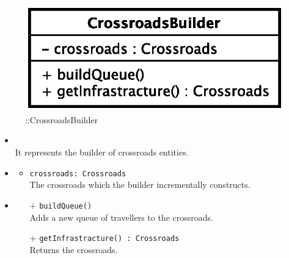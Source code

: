 \begin{figure}[h]
\centering
\includegraphics[scale=0.6,keepaspectratio]{images/solution/app/backend/crossroads_builder.eps}
\caption{\pReactiveBuild::CrossroadsBuilder}
\label{fig:sd-app-crossroads_builder}
\end{figure}
\FloatBarrier
\begin{itemize}
  \item \textbf{\descr} \\
    It represents the builder of crossroads entities. 
    \item \textbf{\attrs}
  \begin{itemize}
    \item \texttt{crossroads: Crossroads} \\
The crossroads which the builder incrementally constructs.
  \end{itemize}
  \item \textbf{\ops}
  \begin{itemize} 
    \item[+] \texttt{buildQueue()} \\
Adds a new queue of travellers to the crossroads.
    \item[+] \texttt{getInfrastracture() : Crossroads} \\
Returns the crossroads.
  \end{itemize}
\end{itemize}
